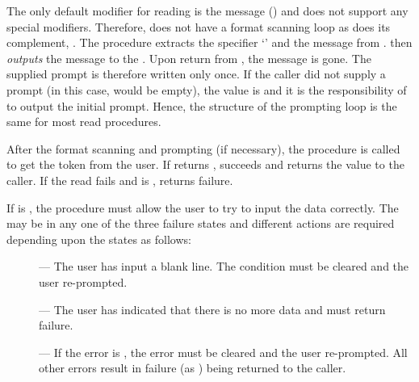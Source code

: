 The only default modifier for reading is the message () and
 does not support any special modifiers.  Therefore,
 does not have a format scanning loop as does 
its complement, .  The procedure 
extracts the specifier `' and the message from
.
 then {\em outputs} the message to
the .  Upon return from
, the message is gone.  The supplied
prompt is therefore written only once.  If the caller did not supply a
prompt (in this case,  would be empty), the value
 is 
and it is the responsibility of  to output the initial prompt.
Hence, the structure of the prompting loop is the same for
most  read procedures.

After the format scanning and prompting (if necessary),
the procedure  is called to get the token from the user.
If  returns ,  succeeds
and returns the value to the caller.   If the read fails and
 is ,  returns failure.


If  is , the procedure  must
allow the user to try to input the data correctly.  The 
may be in any one of the three failure states and different actions
are required depending upon the states as follows:
\begin{description}
\item[] ---
    The user has input a blank line.  The  condition
    must be cleared and the user re-prompted.
\item[] ---
    The user has indicated that there is
    no more data and  must return failure.
\item[] ---
    If the error is , the error must be
    cleared and the user re-prompted.  All other errors result in
    failure (as ) being returned to the caller.
\end{description}

